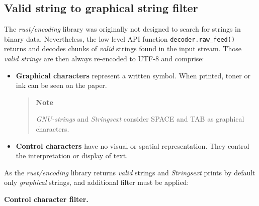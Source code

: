 \hypertarget{filter}{\subsection{Valid string to graphical string
filter}\label{filter}}

The \emph{rust/encoding} library was originally not designed to search
for strings in binary data. Nevertheless, the low level API function
\texttt{decoder.raw\_feed()} returns and decodes chunks of \emph{valid}
strings found in the input stream. Those \emph{valid strings} are then
always re-encoded to UTF-8 and comprise:

\begin{itemize}
\item
  \textbf{Graphical characters} represent a written symbol. When
  printed, toner or ink can be seen on the paper.

  \begin{quote}
  \textbf{Note}

  \emph{GNU-strings} and \emph{Strings­ext} consider SPACE and TAB as
  graphical characters.
  \end{quote}
\item
  \textbf{Control characters} have no visual or spatial representation.
  They control the interpretation or display of text.
\end{itemize}

As the \emph{rust/encoding} library returns \emph{valid} strings and
\emph{Strings­ext} prints by default only \emph{graphical} strings, and
additional filter must be applied:

\textbf{Control character filter.}

